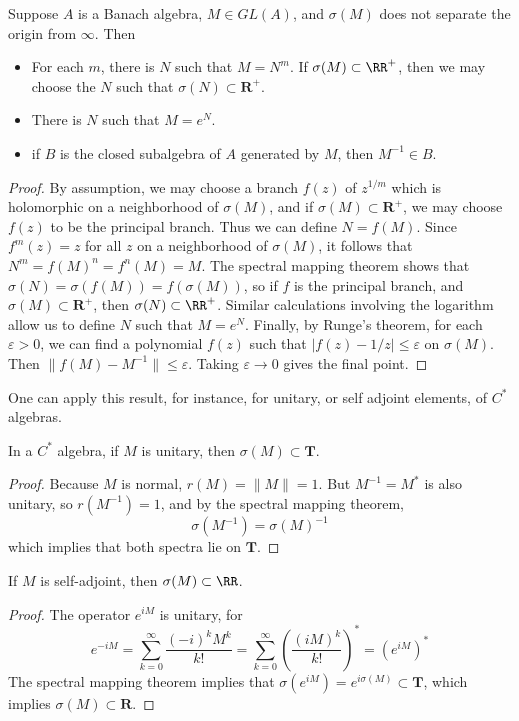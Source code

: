 \begin{theorem}
    Suppose $A$ is a Banach algebra, $M \in GL(A)$, and $\sigma(M)$ does not separate the origin from $\infty$. Then
    \begin{itemize}
        \item For each $m$, there is $N$ such that $M = N^m$. If $\sigma(M) \subset \RR^+$, then we may choose the $N$ such that $\sigma(N) \subset \mathbf{R}^+$.
        \item There is $N$ such that $M = e^N$.
        \item if $B$ is the closed subalgebra of $A$ generated by $M$, then $M^{-1} \in B$.
    \end{itemize}
\end{theorem}
\begin{proof}
    By assumption, we may choose a branch $f(z)$ of $z^{1/m}$ which is holomorphic on a neighborhood of $\sigma(M)$, and if $\sigma(M) \subset \mathbf{R}^+$, we may choose $f(z)$ to be the principal branch. Thus we can define $N = f(M)$. Since $f^m(z) = z$ for all $z$ on a neighborhood of $\sigma(M)$, it follows that $N^m = f(M)^n = f^n(M) = M$. The spectral mapping theorem shows that $\sigma(N) = \sigma(f(M)) = f(\sigma(M))$, so if $f$ is the principal branch, and $\sigma(M) \subset \mathbf{R}^+$, then $\sigma(N) \subset \RR^+$. Similar calculations involving the logarithm allow us to define $N$ such that $M = e^N$. Finally, by Runge's theorem, for each $\varepsilon > 0$, we can find a polynomial $f(z)$ such that $|f(z) - 1/z| \leq \varepsilon$ on $\sigma(M)$. Then $\| f(M) - M^{-1} \| \leq \varepsilon$. Taking $\varepsilon \to 0$ gives the final point.
\end{proof}

One can apply this result, for instance, for unitary, or self adjoint elements, of $C^*$ algebras.

\begin{prop}
    In a $C^*$ algebra, if $M$ is unitary, then $\sigma(M) \subset \mathbf{T}$.
\end{prop}
\begin{proof}
    Because $M$ is normal, $r(M) = \| M \| = 1$. But $M^{-1} = M^*$ is also unitary, so $r(M^{-1}) = 1$, and by the spectral mapping theorem,
    \[ \sigma(M^{-1}) = \sigma(M)^{-1} \]
    which implies that both spectra lie on $\mathbf{T}$.
\end{proof}

\begin{prop}
    If $M$ is self-adjoint, then $\sigma(M) \subset \RR$.
\end{prop}
\begin{proof}
    The operator $e^{iM}$ is unitary, for
    \[ e^{-iM} = \sum_{k = 0}^\infty \frac{(-i)^k M^k}{k!} = \sum_{k = 0}^\infty \left( \frac{(iM)^k}{k!} \right)^* = (e^{iM})^* \]
    The spectral mapping theorem implies that $\sigma(e^{iM}) = e^{i \sigma(M)} \subset \mathbf{T}$, which implies $\sigma(M) \subset \mathbf{R}$.
\end{proof}

